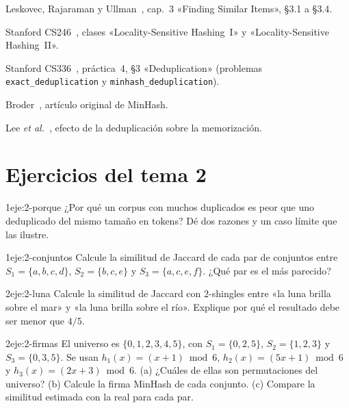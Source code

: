 \begin{lecturas}
\item Leskovec, Rajaraman y Ullman~\cite{mmds}, cap.~3 «Finding Similar Items», §3.1 a §3.4.
\item Stanford CS246~\cite{cs246}, clases «Locality-Sensitive Hashing~I» y «Locality-Sensitive Hashing~II».
\item Stanford CS336~\cite{cs336a4}, práctica~4, §3 «Deduplication» (problemas \texttt{exact\_deduplication} y \texttt{minhash\_deduplication}).
\item Broder~\cite{broder}, artículo original de MinHash.
\item Lee \emph{et al.}~\cite{lee}, efecto de la deduplicación sobre la memorización.
\end{lecturas}

\section*{Ejercicios del tema 2}

\begin{ejercicio}{1}{eje:2-porque}
¿Por qué un corpus con muchos duplicados es peor que uno deduplicado del mismo tamaño en tokens? Dé dos razones y un caso límite que las ilustre.
\end{ejercicio}

\begin{ejercicio}{1}{eje:2-conjuntos}
Calcule la similitud de Jaccard de cada par de conjuntos entre $S_1=\{a,b,c,d\}$, $S_2=\{b,c,e\}$ y $S_3=\{a,c,e,f\}$. ¿Qué par es el más parecido?
\end{ejercicio}

\begin{ejercicio}{2}{eje:2-luna}
Calcule la similitud de Jaccard con $2$-shingles entre «la luna brilla sobre el mar» y «la luna brilla sobre el río». Explique por qué el resultado debe ser menor que $4/5$.
\end{ejercicio}

\begin{ejercicio}{2}{eje:2-firmas}
El universo es $\{0,1,2,3,4,5\}$, con $S_1=\{0,2,5\}$, $S_2=\{1,2,3\}$ y $S_3=\{0,3,5\}$. Se usan $h_1(x)=(x+1)\bmod 6$, $h_2(x)=(5x+1)\bmod 6$ y $h_3(x)=(2x+3)\bmod 6$. (a) ¿Cuáles de ellas son permutaciones del universo? (b) Calcule la firma MinHash de cada conjunto. (c) Compare la similitud estimada con la real para cada par.
\end{ejercicio}

